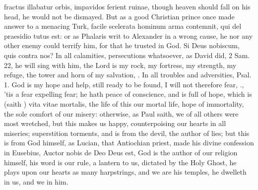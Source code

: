 {fractus illabatur orbis, impavidos ferient ruinae, though heaven should
fall on his head, he would not be dismayed. But as a good Christian
prince once made answer to a menacing Turk, facile scelerata hominum
arma contemnit, qui del praesidio tutus est: or as  Phalaris writ
to Alexander in a wrong cause, he nor any other enemy could terrify
him, for that he trusted in God. Si Deus nobiscum, quis contra nos? In
all calamities, persecutions whatsoever, as David did, 2 Sam.  22,
he will sing with him, the Lord is my rock, my fortress, my strength,
my refuge, the tower and horn of my salvation, \etc{}. In all troubles and
adversities, Psal.  1. God is my hope and help, still ready to be
found, I will not therefore fear, \etc{}., 'tis a fear expelling fear; he
hath peace of conscience, and is full of hope, which is (saith
\Austin{}) vita vitae mortalis, the life of this our mortal life,
hope of immortality, the sole comfort of our misery: otherwise, as Paul
saith, we of all others were most wretched, but this makes us happy,
counterpoising our hearts in all miseries; superstition torments, and
is from the devil, the author of lies; but this is from God himself, as
Lucian, that Antiochian priest, made his divine confession in
Eusebius, Auctor nobis de Deo Deus est, God is the author of our
religion himself, his word is our rule, a lantern to us, dictated by
the Holy Ghost, he plays upon our hearts as many harpstrings, and we
are his temples, he dwelleth in us, and we in him.

}
